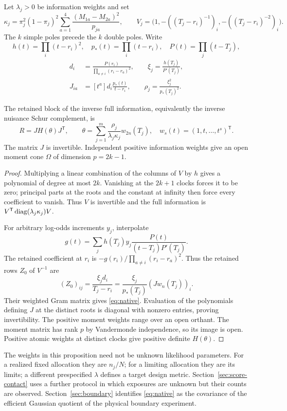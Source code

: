 Let $\lambda_j>0$ be information weights and set
\[
 \kappa_j=\pi_j^2(1-\pi_j)^2\sum_{a=1}^4
      \frac{(M_{1a}-M_{2a})^2}{p_{ja}},\qquad
 V_j=\big(1,-((T_j-r_i)^{-1})_i,-((T_j-r_i)^{-2})_i\big).
\]
The $k$ simple poles precede the $k$ double poles. Write
\[
 h(t)=\prod_i(t-r_i)^2,\quad p_*(t)=\prod_i(t-r_i),\quad P(t)=\prod_j(t-T_j),
\]
\begin{equation}\label{eq:nativeconstants}
 \begin{split}
 d_i&=\frac{P(r_i)}{\prod_{a\ne i}(r_i-r_a)^2},\qquad
 \xi_j=\frac{h(T_j)}{P'(T_j)},\\
 J_{ia}&=[t^a]d_i\frac{p_*(t)}{t-r_i},\qquad
 \rho_j=\frac{\xi_j^2}{p_*(T_j)^2}.
 \end{split}
\end{equation}
\begin{proposition}\label{prop:native}
The retained block of the inverse full information, equivalently the inverse nuisance Schur complement, is
\begin{equation}\label{eq:native}
 R=JH(\theta)J^{\mathsf T},\qquad
 \theta=\sum_{j=1}^m\frac{\rho_j}{\lambda_j\kappa_j}w_{2n}(T_j),
 \quad w_s(t)=(1,t,\ldots,t^s)^{\mathsf T}.
\end{equation}
The matrix $J$ is invertible. Independent positive information weights give an open moment cone $\Omega$ of dimension $p=2k-1$.
\end{proposition}
\begin{proof}
Multiplying a linear combination of the columns of $V$ by $h$ gives a polynomial of degree at most $2k$. Vanishing at the $2k+1$ clocks forces it to be zero; principal parts at the roots and the constant at infinity then force every coefficient to vanish. Thus $V$ is invertible and the full information is $V^{\mathsf T}\operatorname{diag}(\lambda_j\kappa_j)V$.

For arbitrary log-odds increments $y_j$, interpolate
\[
 g(t)=\sum_jh(T_j)y_j\frac{P(t)}{(t-T_j)P'(T_j)}.
\]
The retained coefficient at $r_i$ is $-g(r_i)/\prod_{a\ne i}(r_i-r_a)^2$. Thus the retained rows $Z_0$ of $V^{-1}$ are
\[
 (Z_0)_{ij}=\frac{\xi_jd_i}{T_j-r_i}
        =\frac{\xi_j}{p_*(T_j)}(Jw_n(T_j))_i.
\]
Their weighted Gram matrix gives \eqref{eq:native}. Evaluation of the polynomials defining $J$ at the distinct roots is diagonal with nonzero entries, proving invertibility. The positive moment weights range over an open orthant. The moment matrix has rank $p$ by Vandermonde independence, so its image is open. Positive atomic weights at distinct clocks give positive definite $H(\theta)$.
\end{proof}
The weights in this proposition need not be unknown likelihood parameters. For a realized fixed allocation they are $n_j/N$; for a limiting allocation they are its limits; a different prespecified $\lambda$ defines a target design metric. Section~\ref{sec:score-contact} uses a further protocol in which exposures are unknown but their counts are observed. Section~\ref{sec:boundary} identifies \eqref{eq:native} as the covariance of the efficient Gaussian quotient of the physical boundary experiment.
